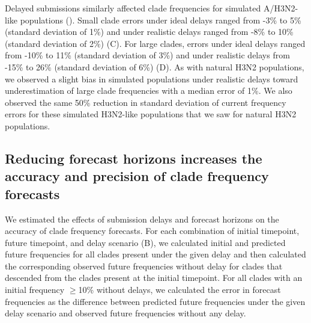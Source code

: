 \documentclass[9pt,lineno]{elife}
\begin{document}
Delayed submissions similarly affected clade frequencies for simulated A/H3N2-like populations ().
Small clade errors under ideal delays ranged from -3\% to 5\% (standard deviation of 1\%) and under realistic delays ranged from -8\% to 10\% (standard deviation of 2\%) (C).
For large clades, errors under ideal delays ranged from -10\% to 11\% (standard deviation of 3\%) and under realistic delays from -15\% to 26\% (standard deviation of 6\%) (D).
As with natural H3N2 populations, we observed a slight bias in simulated populations under realistic delays toward underestimation of large clade frequencies with a median error of 1\%.
We also observed the same 50\% reduction in standard deviation of current frequency errors for these simulated H3N2-like populations that we saw for natural H3N2 populations.

\subsection{Reducing forecast horizons increases the accuracy and precision of clade frequency forecasts}

We estimated the effects of submission delays and forecast horizons on the accuracy of clade frequency forecasts.
For each combination of initial timepoint, future timepoint, and delay scenario (B), we calculated initial and predicted future frequencies for all clades present under the given delay and then calculated the corresponding observed future frequencies without delay for clades that descended from the clades present at the initial timepoint.
For all clades with an initial frequency $\ge$10\% without delays, we calculated the error in forecast frequencies as the difference between predicted future frequencies under the given delay scenario and observed future frequencies without any delay.
\end{document}
